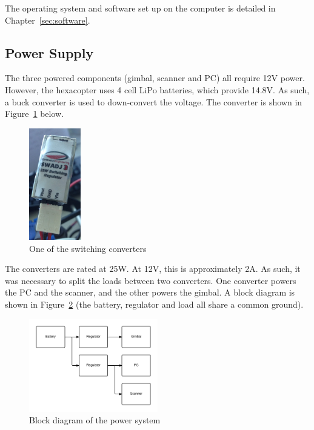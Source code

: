 \documentclass[12pt,oneside,a4paper]{book}
\begin{document}
The operating system and software set up on the computer is detailed
in Chapter~\ref{sec:software}.
\newpage
\subsection{Power Supply}
\label{sec:power-supply-cons}

The three powered components (gimbal, scanner and PC) all require 12V
power. However, the hexacopter uses 4 cell LiPo batteries, which
provide 14.8V. As such, a buck converter is used to down-convert the
voltage. The converter is shown in
Figure~\ref{fig:converter} below.

\begin{figure}[h!]
  \centering
  \includegraphics[width=0.2\textwidth]{figs/converter}
  \caption{One of the switching converters}
  \label{fig:converter}
\end{figure}

The converters are rated at 25W. At 12V, this is approximately 2A. As
such, it was necessary to split the loads between two converters. One
converter powers the PC and the scanner, and the other powers the
gimbal. A block diagram is shown in Figure~\ref{fig:power} (the
battery, regulator and load all share a common ground).

\begin{figure}[h!]
  \centering
  \includegraphics[width=0.5\textwidth]{figs/power}
  \caption{Block diagram of the power system}
  \label{fig:power}
\end{figure}
\end{document}
